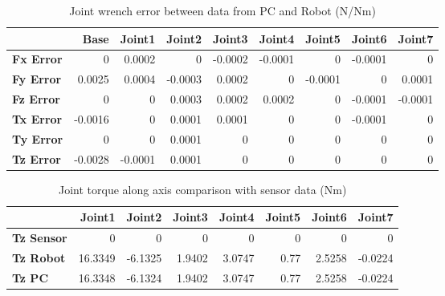 \begin{table}[h!]
	\centering
	\caption{Joint wrench error between data from PC and Robot (N/Nm)}
	\label{wrech_Error_Pose7}
	\begin{tabular}{|l|r|r|r|r|r|r|r|r|}
		\hline
		\textbf{}  & \textbf{Base} & \textbf{Joint1}  & \textbf{Joint2}  & \textbf{Joint3}  & \textbf{Joint4}  & \textbf{Joint5}  & \textbf{Joint6}  & \textbf{Joint7} \\ \hline
		\textbf{Fx Error}  & 0        & 0.0002        & 0        & -0.0002        & -0.0001        & 0        & -0.0001        & 0 \\ \hline
		\textbf{Fy Error}  & 0.0025        & 0.0004        & -0.0003        & 0.0002        & 0        & -0.0001        & 0        & 0.0001 \\ \hline
		\textbf{Fz Error}  & 0        & 0        & 0.0003        & 0.0002        & 0.0002        & 0        & -0.0001        & -0.0001 \\ \hline
		\textbf{Tx Error}  & -0.0016        & 0        & 0.0001        & 0.0001        & 0        & 0        & -0.0001        & 0 \\ \hline
		\textbf{Ty Error}  & 0        & 0        & 0.0001        & 0        & 0        & 0        & 0        & 0 \\ \hline
		\textbf{Tz Error}  & -0.0028        & -0.0001        & 0.0001        & 0        & 0        & 0        & 0        & 0 \\ \hline
	\end{tabular}
\end{table}

\begin{table}[h!]
	\centering
	\caption{Joint torque along axis comparison with sensor data (Nm)}
	\label{wrech_Sensor_Pose7}
	\begin{tabular}{|l|r|r|r|r|r|r|r|}
		\hline
		\textbf{} & \textbf{Joint1} & \textbf{Joint2} & \textbf{Joint3} & \textbf{Joint4} & \textbf{Joint5} & \textbf{Joint6} & \textbf{Joint7} \\ \hline
		\textbf{Tz Sensor}  & 0           & 0           & 0            & 0           & 0           & 0           & 0           \\ \hline
		\textbf{Tz Robot}  	& 16.3349           & -6.1325           & 1.9402            & 3.0747           & 0.77           & 2.5258           & -0.0224           \\ \hline
		\textbf{Tz PC}  	& 16.3348           & -6.1324           & 1.9402            & 3.0747           & 0.77           & 2.5258           & -0.0224           \\ \hline
	\end{tabular}
\end{table}

